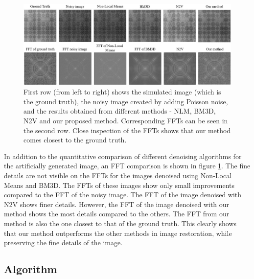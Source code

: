\documentclass[fleqn,10pt]{wlscirep}
\begin{document}
	\begin{figure}[H]
		\centering
		\includegraphics[scale=0.6]{./imgs/comparison-sample_fft.jpg}
		\caption{First row (from left to right) shows the simulated image (which is the ground truth), the noisy image created by adding Poisson noise, and the results obtained from different methods - NLM, BM3D, N2V and our proposed method. Corresponding FFTs can be seen in the second row. Close inspection of the FFTs shows that our method comes closest to the ground truth.}
		\label{fig:comparison_sample_fft}
	\end{figure}

	In addition to the quantitative comparison of different denoising algorithms for the artificially generated image, an FFT comparison is shown in figure \ref{fig:comparison_sample_fft}. The fine details are not visible on the FFTs for the images denoised using Non-Local Means and BM3D. The FFTs of these images show only small improvements compared to the FFT of the noisy image. The FFT of the image denoised with N2V shows finer details. However, the FFT of the image denoised with our method shows the most details compared to the others. The FFT from our method is also the one closest to that of the ground truth. This clearly shows that our method outperforms the other methods in image restoration, while preserving the fine details of the image. 
	
	\subsection*{Algorithm}
	\label{algorithms}
	
\end{document}
